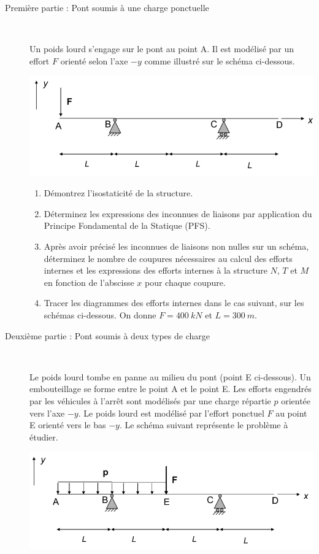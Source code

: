 \documentclass[lecture.tex]{subfiles}
\begin{document}
\begin{description}
  \item[Première partie : Pont soumis à une charge ponctuelle] \ \par
  Un poids lourd s’engage sur le pont au point A. Il est modélisé par un effort $F$ orienté selon l’axe $-y$ comme illustré sur le schéma ci-dessous.
  \begin{center}
    \includegraphics[scale=0.4]{figC0025.png}
  \end{center}
  \begin{enumerate}
    \item Démontrez l'isostaticité de la structure.
    \item Déterminez les expressions des inconnues de liaisons par application du Principe Fondamental de la Statique (PFS).
    \item Après avoir précisé les inconnues de liaisons non nulles sur un schéma, déterminez le nombre de coupures nécessaires au calcul des efforts internes et les expressions des efforts internes à la structure $N$, $T$ et $M$ en fonction de l'abscisse $x$ pour chaque coupure.
    \item Tracer les diagrammes des efforts internes dans le cas suivant, sur les schémas ci-dessous. On donne $F = 400 \ kN$ et $L = 300 \ m$.
  \end{enumerate}
  \item[Deuxième partie : Pont soumis à deux types de charge] \ \par
  Le poids lourd tombe en panne au milieu du pont (point E ci-dessous). Un embouteillage se forme entre le point A et le point E. Les efforts engendrés par les véhicules à l’arrêt sont modélisés par une charge répartie $p$ orientée vers l’axe $-y$. Le poids lourd est modélisé par l’effort ponctuel $F$ au point E orienté vers le bas $-y$. Le schéma suivant représente le problème à étudier.
  \begin{center}
    \includegraphics[scale=0.4]{figD0025.png}

\end{center}
\end{description}
\end{document}
